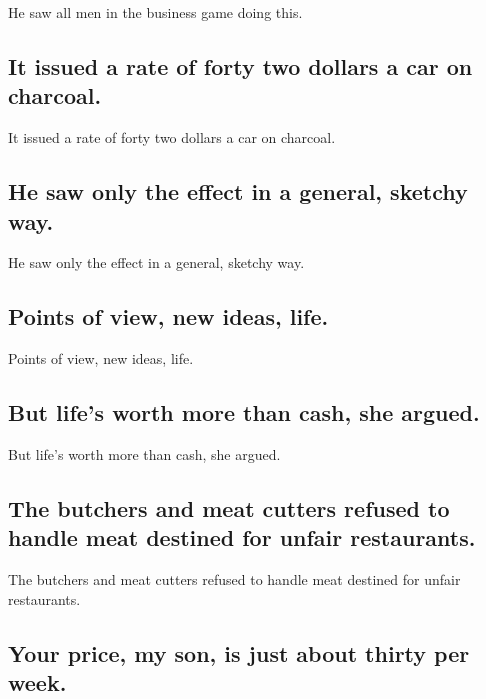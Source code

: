 \documentclass[]{article}
\begin{document}
He saw all men in the business game doing this.

\hypertarget{it-issued-a-rate-of-forty-two-dollars-a-car-on-charcoal.}{%
\subsection{It issued a rate of forty two dollars a car on
charcoal.}\label{it-issued-a-rate-of-forty-two-dollars-a-car-on-charcoal.}}

It issued a rate of forty two dollars a car on charcoal.

\hypertarget{he-saw-only-the-effect-in-a-general-sketchy-way.}{%
\subsection{He saw only the effect in a general, sketchy
way.}\label{he-saw-only-the-effect-in-a-general-sketchy-way.}}

He saw only the effect in a general, sketchy way.

\hypertarget{points-of-view-new-ideas-life.}{%
\subsection{Points of view, new ideas,
life.}\label{points-of-view-new-ideas-life.}}

Points of view, new ideas, life.

\hypertarget{but-lifes-worth-more-than-cash-she-argued.}{%
\subsection{But life's worth more than cash, she
argued.}\label{but-lifes-worth-more-than-cash-she-argued.}}

But life's worth more than cash, she argued.

\hypertarget{the-butchers-and-meat-cutters-refused-to-handle-meat-destined-for-unfair-restaurants.}{%
\subsection{The butchers and meat cutters refused to handle meat
destined for unfair
restaurants.}\label{the-butchers-and-meat-cutters-refused-to-handle-meat-destined-for-unfair-restaurants.}}

The butchers and meat cutters refused to handle meat destined for unfair
restaurants.

\hypertarget{your-price-my-son-is-just-about-thirty-per-week.}{%
\subsection{Your price, my son, is just about thirty per
week.}\label{your-price-my-son-is-just-about-thirty-per-week.}}
\end{document}
